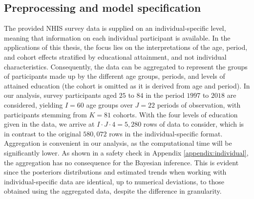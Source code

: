 \subsection{Preprocessing and model specification}\label{section:application1:specification}
The provided NHIS survey data is supplied on an individual-specific level, meaning that information on each individual participant is available. In the applications of this thesis, the focus lies on the interpretations of the age, period, and cohort effects stratified by educational attainment, and not individual characteristics. Consequently, the data can be aggregated to represent the groups of participants made up by the different age groups, periods, and levels of attained education (the cohort is omitted as it is derived from age and period). In our analysis, survey participants aged $25$ to $84$ in the period $1997$ to $2018$ are considered, yielding $I = 60$ age groups over $J=22$ periods of observation, with participants stemming from $K=81$ cohorts. With the four levels of education given in the data, we arrive at $I\cdot J\cdot 4=5,280$ rows of data to consider, which is in contrast to the original $580,072$ rows in the individual-specific format. Aggregation is convenient in our analysis, as the computational time will be significantly lower. As shown in a safety check in Appendix \ref{appendix:individual}, the aggregation has no consequence for the Bayesian inference. This is evident since the posteriors distributions and estimated trends when working with individual-specific data are identical, up to numerical deviations, to those obtained using the aggregated data, despite the difference in granularity.

